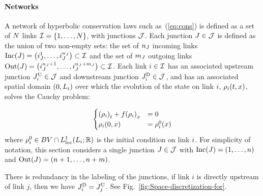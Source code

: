 \paragraph*{Networks}

A network of hyperbolic conservation laws such as~(\ref{eq:cons})
is defined as a set of $N$ links $\links=\intrange 1{\nlinks}$,
with junctions $\mathcal{J}$. Each junction $J\in\mathcal{J}$ is defined
as the union of  two non-empty sets: the set of $n_{J}$ incoming links $\Inc\left(\jn\right)=\tuple{\jlink{\jn}1}{\jlink{\jn}{\ninc_{\jn}}}\subset\links$
and the set of $m_{J}$ outgoing links $\Out\left(\jn\right)=\tuple{\jlink{\jn}{\ninc_{\jn}+1}}{\jlink{\jn}{\ninc_{\jn}+\nout_{\jn}}}\subset\links$.
Each link $i\in\mathcal{I}$ has an associated upstream junction $J_{i}^{\text{U}}\in\mathcal{J}$
and downstream junction $J_{i}^{\text{D}}\in\mathcal{J}$, and has an associated
spatial domain $\left(0,L_{\link}\right)$ over which the evolution
of the state on link $i$, $\rho_{\link}\left(t,x\right)$, solves
the Cauchy problem:

\begin{equation}
\begin{cases}
\left(\rho_{\link}\right)_{t}+f\left(\rho_{\link}\right)_{x} & =0\\
\rho_{\link}\left(0,x\right) & =\rho^0_{\link}\left(x\right)
\end{cases}\label{eq:cauchy-i}
\end{equation}
where $\rho^0_{\link}\in BV\cap L_{\text{loc}}^{1}\left(L_i;\mathbb{R}\right)$
is the initial condition on link $i$. For simplicity of notation,
this section considers a single junction $J\in\mathcal{J}$ with $\Inc\left(\jn\right)=\left(1,\ldots,\ninc\right)$
and $\Out\left(\jn\right)=\left(\ninc+1,\ldots,\ninc+\nout\right)$.
\begin{rem}
There is redundancy in the labeling of the junctions, if link
$i$ is directly upstream of link $j$, then we have $J_{i}^{\text{D}}=J_{j}^{\text{U}}$.
See Fig.~\ref{fig:Space-discretization-for}.
\end{rem}


